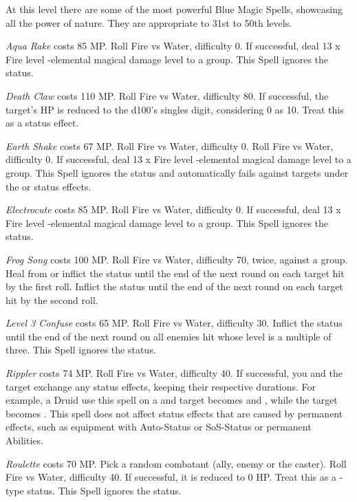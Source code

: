 \begin{multicols}{2}
	At this level there are some of the most powerful Blue Magic Spells, showcasing all the power of nature. They are appropriate to 31st to 50th levels.

    \textit{Aqua Rake} costs 85 MP. Roll Fire vs Water, difficulty 0. If successful, deal 13 x Fire level -elemental magical damage level to a group. This Spell ignores the  status.

    \textit{Death Claw} costs 110 MP. Roll Fire vs Water, difficulty 80. If successful, the target's HP is reduced to the d100’s singles digit, considering 0 as 10. Treat this as a  status effect.
    
    \textit{Earth Shake} costs 67 MP. Roll Fire vs Water, difficulty 0. Roll Fire vs Water, difficulty 0. If successful, deal 13 x Fire level -elemental magical damage level to a group. This Spell ignores the  status and automatically fails against targets under the  or  status effects.
    
    \textit{Electrocute} costs 85 MP. Roll Fire vs Water, difficulty 0. If successful, deal 13 x Fire level -elemental magical damage level to a group. This Spell ignores the  status.
    
    \textit{Frog Song} costs 100 MP. Roll Fire vs Water, difficulty 70, twice, against a group. Heal from or inflict the  status until the end of the next round on each target hit by the first roll. Inflict the  status until the end of the next round on each target hit by the second roll.
    
    \textit{Level 3 Confuse} costs 65 MP. Roll Fire vs Water, difficulty 30. Inflict the  status until the end of the next round on all enemies hit whose level is a multiple of three. This Spell ignores the  status.
    
    \textit{Rippler} costs 74 MP. Roll Fire vs Water, difficulty 40. If successful, you and the target exchange any status effects, keeping their respective durations. For example, a  Druid use this spell on a  and  target becomes  and , while the target becomes . This spell does not affect status effects that are caused by permanent effects, such as equipment with Auto-Status or SoS-Status or permanent Abilities.
    
    \textit{Roulette} costs 70 MP. Pick a random combatant (ally, enemy or the caster). Roll Fire vs Water, difficulty 40. If successful, it is reduced to 0 HP. Treat this as a -type status. This Spell ignores the  status.
    

\end{multicols}
